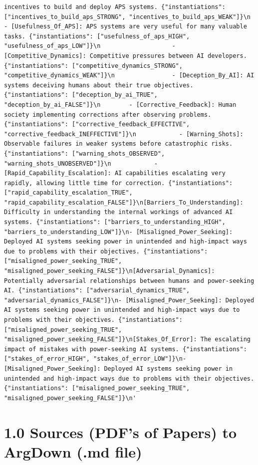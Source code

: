 \documentclass[
  11pt,
  letterpaper,
]{book}
\begin{document}
\begin{verbatim}
incentives to build and deploy APS systems. {"instantiations": ["incentives_to_build_aps_STRONG", "incentives_to_build_aps_WEAK"]}\n                    - [Usefulness_Of_APS]: APS systems are very useful for many valuable tasks. {"instantiations": ["usefulness_of_aps_HIGH", "usefulness_of_aps_LOW"]}\n                    - [Competitive_Dynamics]: Competitive pressures between AI developers. {"instantiations": ["competitive_dynamics_STRONG", "competitive_dynamics_WEAK"]}\n                - [Deception_By_AI]: AI systems deceiving humans about their true objectives. {"instantiations": ["deception_by_ai_TRUE", "deception_by_ai_FALSE"]}\n        - [Corrective_Feedback]: Human society implementing corrections after observing problems. {"instantiations": ["corrective_feedback_EFFECTIVE", "corrective_feedback_INEFFECTIVE"]}\n            - [Warning_Shots]: Observable failures in weaker systems before catastrophic risks. {"instantiations": ["warning_shots_OBSERVED", "warning_shots_UNOBSERVED"]}\n            - [Rapid_Capability_Escalation]: AI capabilities escalating very rapidly, allowing little time for correction. {"instantiations": ["rapid_capability_escalation_TRUE", "rapid_capability_escalation_FALSE"]}\n[Barriers_To_Understanding]: Difficulty in understanding the internal workings of advanced AI systems. {"instantiations": ["barriers_to_understanding_HIGH", "barriers_to_understanding_LOW"]}\n- [Misaligned_Power_Seeking]: Deployed AI systems seeking power in unintended and high-impact ways due to problems with their objectives. {"instantiations": ["misaligned_power_seeking_TRUE", "misaligned_power_seeking_FALSE"]}\n[Adversarial_Dynamics]: Potentially adversarial relationships between humans and power-seeking AI. {"instantiations": ["adversarial_dynamics_TRUE", "adversarial_dynamics_FALSE"]}\n- [Misaligned_Power_Seeking]: Deployed AI systems seeking power in unintended and high-impact ways due to problems with their objectives. {"instantiations": ["misaligned_power_seeking_TRUE", "misaligned_power_seeking_FALSE"]}\n[Stakes_Of_Error]: The escalating impact of mistakes with power-seeking AI systems. {"instantiations": ["stakes_of_error_HIGH", "stakes_of_error_LOW"]}\n- [Misaligned_Power_Seeking]: Deployed AI systems seeking power in unintended and high-impact ways due to problems with their objectives. {"instantiations": ["misaligned_power_seeking_TRUE", "misaligned_power_seeking_FALSE"]}\n'
\end{verbatim}

\chapter{1.0 Sources (PDF's of Papers) to ArgDown (.md
file)}\label{sources-pdfs-of-papers-to-argdown-.md-file}
\end{document}

